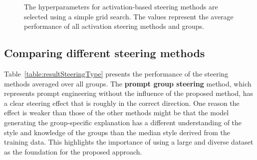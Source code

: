 \begin{figure}[ht]
  \begin{subfigure}[t]{0.49\linewidth}
    \label{fig:activationSteeringHPO:steeringEffect}
  \end{subfigure}
  \hfill
  \begin{subfigure}[t]{0.49\linewidth}
    \label{fig:activationSteeringHPO:directionCorrectness}
  \end{subfigure}
  \caption{The hyperparameters for activation-based steering methods are selected using a simple grid search. The values represent the average performance of all activation steering methods and groups.}%
  \label{fig:activationSteeringHPO}
\end{figure}


\subsection{Comparing different steering methods}
\label{sec:evaluation:steering:methods}

Table~\ref{table:resultSteeringType} presents the performance of the steering methods averaged over all groups. The \textbf{prompt group steering} method, which represents prompt engineering without the influence of the proposed method, has a clear steering effect that is roughly in the correct direction. One reason the effect is weaker than those of the other methods might be that the model generating the group-specific explanation has a different understanding of the style and knowledge of the groups than the median style derived from the training data. This highlights the importance of using a large and diverse dataset as the foundation for the proposed approach.

\begin{table}[ht]
  \caption[]{This table shows the performance of different steering methods using the metrics displayed in Figure~\ref{fig:steeringMetrics}. The possible steering effect is not used in this experiment, because it would be the same for all methods as the values are averages over all groups. The experiment demonstrates that mentioning the attributes in the system prompt improves steering performance significantly. %
    Additionally, the experiment demonstrates that the newly proposed activation-based steering methods (see Section~\ref{sec:approach:steering:activation}) lead to a clear improvement over prompt engineering techniques.}%
  \label{table:resultSteeringType}
  \centering
  \resultSteeringType{}%
\end{table}

